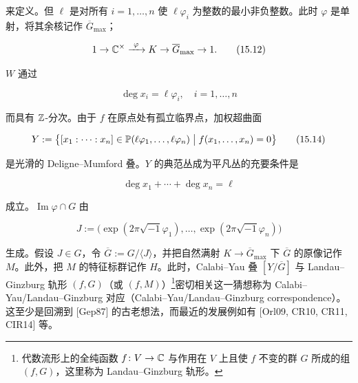 
来定义。但 $\ell$ 是对所有 $i=1,\dots,n$ 使 $\ell\varphi_i$ 为整数的最小非负整数。此时 $\varphi$ 是单射，将其余核记作 $\overline{G}_{\max}$；

\begin{equation}
  1 \to \C^{\times} \xrightarrow{\ \varphi\ } K \to \overline{G}_{\max} \to 1. \tag{15.12}
\end{equation}

$W$ 通过

\begin{equation}
  \deg x_i = \ell\varphi_i,\quad i=1,\dots,n \tag{15.13}
\end{equation}

而具有 $\mathbb{Z}$-分次。由于 $f$ 在原点处有孤立临界点，加权超曲面

\begin{equation}
  Y := \bigl\{[x_1:\cdots:x_n]\in\mathbb{P}(\ell\varphi_1,\dots,\ell\varphi_n) \bigm| f(x_1,\dots,x_n)=0\bigr\} \tag{15.14}
\end{equation}

是光滑的 Deligne–Mumford 叠。$Y$ 的典范丛成为平凡丛的充要条件是

\begin{equation}
  \deg x_1 + \cdots + \deg x_n = \ell \tag{15.15}
\end{equation}

成立。$\operatorname{Im}\varphi\cap G$ 由

\begin{equation}
  J := \bigl(\exp(2\pi\sqrt{-1}\varphi_1),\dots,\exp(2\pi\sqrt{-1}\varphi_n)\bigr) \tag{15.16}
\end{equation}

生成。假设 $J\in G$，令 $\overline{G} := G/\langle J\rangle$，并把自然满射 $K\to\overline{G}_{\max}$ 下 $\overline{G}$ 的原像记作 $M$。此外，把 $M$ 的特征标群记作 $H$。此时，Calabi–Yau 叠 $[Y/\overline{G}]$ 与 Landau–Ginzburg 轨形 $(f,G)$（或 $(f,M)$）\footnote{代数流形上的全纯函数 $f\colon V\to\mathbb{C}$ 与作用在 $V$ 上且使 $f$ 不变的群 $G$ 所成的组 $(f,G)$，这里称为 Landau–Ginzburg 轨形。}密切相关这一猜想称为 Calabi–Yau/Landau–Ginzburg 对应（Calabi–Yau/Landau–Ginzburg correspondence）。这至少是回溯到 [Gep87] 的古老想法，而最近的发展例如有 [Orl09, CR10, CR11, CIR14] 等。

